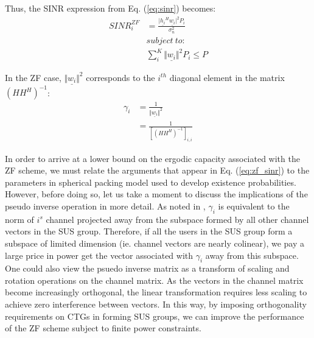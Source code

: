  Thus, the SINR expression from Eq. (\ref{eq:sinr}) becomes:
  \begin{equation}\label{eq:zf_sinr}
     \begin{aligned}
        SINR_i^{ZF} &= \frac{\vert \underline{h_i}^H \underline{w_i} \vert^2 P_i}{\sigma_n^2}\\
        &subject\ to:\\
        &\sum_i^K \Vert \underline{w_i} \Vert ^2 P_i \leq P
     \end{aligned}
 \end{equation}
 
 In the ZF case, $\Vert \underline{w_i}\Vert ^2$ corresponds to the $i^{th}$ diagonal element in the matrix $(HH^H)^{-1}$:
 \begin{equation}\label{eq:zf_gamma}
     \begin{aligned}
        \gamma_i &= \frac{1}{\Vert \underline{w_i}\Vert ^2}\\
        &= \frac{1}{[(HH^H)^{-1}]_{i,i}}
     \end{aligned}
 \end{equation}
 
 In order to arrive at a lower bound on the ergodic capacity associated with the ZF scheme, we must relate the arguments that appear in Eq. (\ref{eq:zf_sinr}) to the parameters in spherical packing model used to develop existence probabilities. However, before doing so, let us take a moment to discuss the implications of the pseudo inverse operation in more detail. As noted in \cite{Caire2003}, $\gamma_i$ is equivalent to the norm of $i^{s}$ channel projected away from the subspace formed by all other channel vectors in the SUS group. Therefore, if all the users in the SUS group form a subspace of limited dimension (ie. channel vectors are nearly colinear), we pay a large price in power get the vector associated with $\gamma_i$ away from this subspace. One could also view the psuedo inverse matrix as a transform of scaling and rotation operations on the channel matrix. As the vectors in the channel matrix become increasingly orthogonal, the linear transformation requires less scaling to achieve zero interference between vectors. In this way, by imposing orthogonality requirements on CTGs in forming SUS groups, we can improve the performance of the ZF scheme subject to finite power constraints.
 
